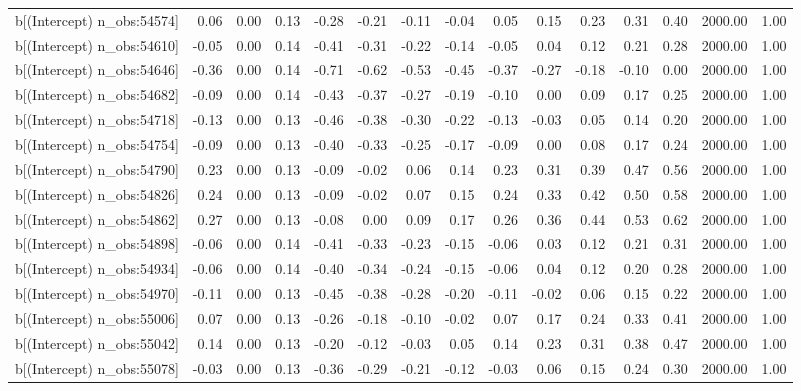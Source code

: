\begin{table}[ht]
\begin{tabular}{rrrrrrrrrrrrrrr}
  b[(Intercept) n\_obs:54574] & 0.06 & 0.00 & 0.13 & -0.28 & -0.21 & -0.11 & -0.04 & 0.05 & 0.15 & 0.23 & 0.31 & 0.40 & 2000.00 & 1.00 \\ 
  b[(Intercept) n\_obs:54610] & -0.05 & 0.00 & 0.14 & -0.41 & -0.31 & -0.22 & -0.14 & -0.05 & 0.04 & 0.12 & 0.21 & 0.28 & 2000.00 & 1.00 \\ 
  b[(Intercept) n\_obs:54646] & -0.36 & 0.00 & 0.14 & -0.71 & -0.62 & -0.53 & -0.45 & -0.37 & -0.27 & -0.18 & -0.10 & 0.00 & 2000.00 & 1.00 \\ 
  b[(Intercept) n\_obs:54682] & -0.09 & 0.00 & 0.14 & -0.43 & -0.37 & -0.27 & -0.19 & -0.10 & 0.00 & 0.09 & 0.17 & 0.25 & 2000.00 & 1.00 \\ 
  b[(Intercept) n\_obs:54718] & -0.13 & 0.00 & 0.13 & -0.46 & -0.38 & -0.30 & -0.22 & -0.13 & -0.03 & 0.05 & 0.14 & 0.20 & 2000.00 & 1.00 \\ 
  b[(Intercept) n\_obs:54754] & -0.09 & 0.00 & 0.13 & -0.40 & -0.33 & -0.25 & -0.17 & -0.09 & 0.00 & 0.08 & 0.17 & 0.24 & 2000.00 & 1.00 \\ 
  b[(Intercept) n\_obs:54790] & 0.23 & 0.00 & 0.13 & -0.09 & -0.02 & 0.06 & 0.14 & 0.23 & 0.31 & 0.39 & 0.47 & 0.56 & 2000.00 & 1.00 \\ 
  b[(Intercept) n\_obs:54826] & 0.24 & 0.00 & 0.13 & -0.09 & -0.02 & 0.07 & 0.15 & 0.24 & 0.33 & 0.42 & 0.50 & 0.58 & 2000.00 & 1.00 \\ 
  b[(Intercept) n\_obs:54862] & 0.27 & 0.00 & 0.13 & -0.08 & 0.00 & 0.09 & 0.17 & 0.26 & 0.36 & 0.44 & 0.53 & 0.62 & 2000.00 & 1.00 \\ 
  b[(Intercept) n\_obs:54898] & -0.06 & 0.00 & 0.14 & -0.41 & -0.33 & -0.23 & -0.15 & -0.06 & 0.03 & 0.12 & 0.21 & 0.31 & 2000.00 & 1.00 \\ 
  b[(Intercept) n\_obs:54934] & -0.06 & 0.00 & 0.14 & -0.40 & -0.34 & -0.24 & -0.15 & -0.06 & 0.04 & 0.12 & 0.20 & 0.28 & 2000.00 & 1.00 \\ 
  b[(Intercept) n\_obs:54970] & -0.11 & 0.00 & 0.13 & -0.45 & -0.38 & -0.28 & -0.20 & -0.11 & -0.02 & 0.06 & 0.15 & 0.22 & 2000.00 & 1.00 \\ 
  b[(Intercept) n\_obs:55006] & 0.07 & 0.00 & 0.13 & -0.26 & -0.18 & -0.10 & -0.02 & 0.07 & 0.17 & 0.24 & 0.33 & 0.41 & 2000.00 & 1.00 \\ 
  b[(Intercept) n\_obs:55042] & 0.14 & 0.00 & 0.13 & -0.20 & -0.12 & -0.03 & 0.05 & 0.14 & 0.23 & 0.31 & 0.38 & 0.47 & 2000.00 & 1.00 \\ 
  b[(Intercept) n\_obs:55078] & -0.03 & 0.00 & 0.13 & -0.36 & -0.29 & -0.21 & -0.12 & -0.03 & 0.06 & 0.15 & 0.24 & 0.30 & 2000.00 & 1.00 \\ 

\end{tabular}
\end{table}
